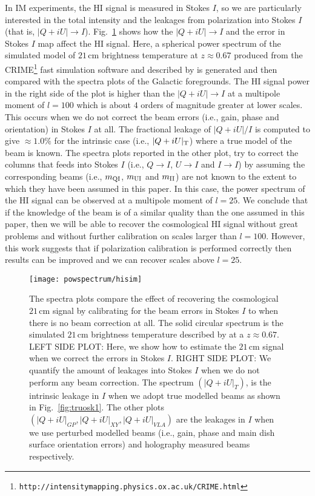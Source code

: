 In IM experiments, the HI signal is measured in Stokes $I$, so we are particularly interested in the total intensity and the leakages from polarization 
into Stokes $I$ (that is, $|Q + iU| \longrightarrow I$). Fig.~\ref{fig:lk} shows how the $|Q + iU| \longrightarrow I$  and the error in Stokes $I$ map affect the HI signal. 
Here, a spherical power spectrum of the simulated model of $21\, \mathrm{cm}$  brightness temperature at $z \approx 0.67$ produced from the 
CRIME\footnote{{\tt http://intensitymapping.physics.ox.ac.uk/CRIME.html}} fast simulation software and described by \citep{2014MNRAS.444.3183A} 
is generated and then compared with the spectra plots of the  Galactic foregrounds. %
The HI signal power in the right side of the plot is higher than the $|Q + iU| \longrightarrow I$ at a multipole moment of $l=100$ which is about $4$ orders of magnitude greater at lower scales. 
This occurs when we do not correct the beam errors (i.e., gain, phase and orientation) in Stokes $I$ at all. 
The fractional leakage of $|Q + iU|/I$ is computed to give $\approx 1.0 \%$ for the intrinsic case (i.e., $|Q + iU|_{\rm T}$) where a true model of the beam is known.
The spectra plots reported in the other plot, try to correct the columns that feeds into Stokes $I$ (i.e., $Q \longrightarrow I$, $U \longrightarrow I$ and $I \longrightarrow I$)
by assuming the corresponding beams (i.e., $m_{\rm QI}$, $m_{\rm UI}$ and $m_{\rm II}$) are not known to the extent to which they have been assumed in this paper. In this case,
the power spectrum of the HI signal can be observed at a multipole moment of $l=25$.
We conclude that if the knowledge of the beam is of a similar quality than the one assumed in this paper, then we will be able to recover the cosmological HI signal 
without great problems and without further calibration on scales larger than $l = 100$. However, this work suggests that if polarization calibration is performed correctly 
then results can be improved and we can recover scales above $l=25$. 
\begin{figure}
\centering    
    \texttt{[image: powspectrum/hisim]}
 \caption{The spectra plots compare the effect of recovering the cosmological $21\, \mathrm{cm}$ signal by calibrating for the beam errors in Stokes $I$ 
  to when there is no beam correction at  all. The solid circular spectrum is the simulated $21\, \mathrm{cm}$ 
  brightness temperature described by \citep{2014MNRAS.444.3183A} at a $z\approx 0.67$. 
  LEFT SIDE PLOT: Here, we show how to estimate the $21\, \mathrm{cm}$ signal when we correct the errors in Stokes $I$.         
  RIGHT SIDE PLOT: We quantify the amount of leakages into Stokes $I$ when we do not perform any beam correction.
  The spectrum $ (|Q + iU|_{T} )$, is the intrinsic leakage in $I$ when we adopt true modelled beams as shown in  Fig.~\ref{fig:truosk1}.
  The other plots $( |Q + iU|_{GP}, |Q + iU|_{XY} , |Q + iU|_{VLA})$  are the leakages in $I$ when we use perturbed modelled beams (i.e., gain, phase and main dish surface orientation errors) and holography measured beams respectively.}\label{fig:lk}
 \end{figure} 
 \FloatBarrier

